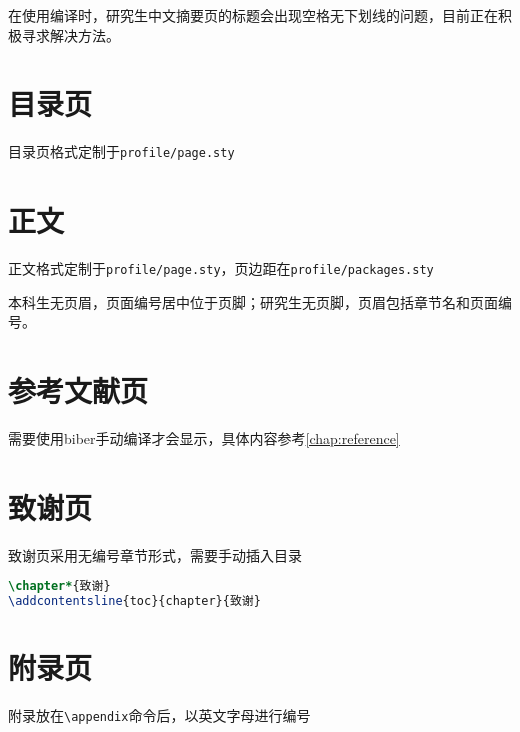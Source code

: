 在使用编译时，研究生中文摘要页的标题会出现空格无下划线的问题，目前正在积极寻求解决方法。

\section{目录页}

目录页格式定制于\texttt{profile/page.sty}

\section{正文}

正文格式定制于\texttt{profile/page.sty}，页边距在\texttt{profile/packages.sty}

本科生无页眉，页面编号居中位于页脚；研究生无页脚，页眉包括章节名和页面编号。


\section{参考文献页}

需要使用biber手动编译才会显示，具体内容参考\cref{chap:reference}

\section{致谢页}

致谢页采用无编号章节形式，需要手动插入目录
\begin{lstlisting}[language=TeX]
\chapter*{致谢}
\addcontentsline{toc}{chapter}{致谢}
\end{lstlisting}

\section{附录页}

附录放在\lstinline|\appendix|命令后，以英文字母进行编号
